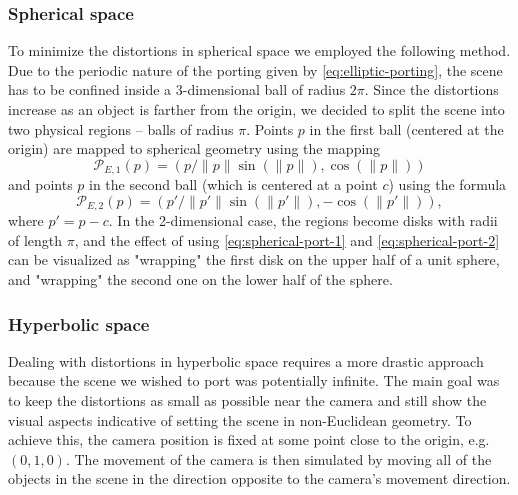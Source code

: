 \subsubsection*{Spherical space}
To minimize the distortions in spherical space we employed the following method.
Due to the periodic nature of the porting given by \autoref{eq:elliptic-porting}, the scene has to be confined inside a 3-dimensional ball of radius $2\pi$.
Since the distortions increase as an object is farther from the origin, we decided to split the scene into two physical regions -- balls of radius $\pi$.
Points $p$ in the first ball (centered at the origin) are mapped to spherical geometry using the mapping
\begin{equation} \label{eq:spherical-port-1}
    \mathcal{P}_{E,1}(p) = (p / \lVert p\rVert \sin(\lVert p\rVert), \cos(\lVert p\rVert))
\end{equation}
and points $p$ in the second ball (which is centered at a point $c$) using the formula
\begin{equation}\label{eq:spherical-port-2}
    \mathcal{P}_{E,2}(p) = (p' / \lVert p' \rVert \sin(\lVert p' \rVert), -\cos(\lVert p'\rVert)),
\end{equation}
where $p' = p - c$.
In the 2-dimensional case, the regions become disks with radii of length $\pi$, and the effect of using \autoref{eq:spherical-port-1} and \autoref{eq:spherical-port-2} can be visualized as "wrapping" the first disk on the upper half of a unit sphere, and "wrapping" the second one on the lower half of the sphere.


\subsubsection*{Hyperbolic space}
Dealing with distortions in hyperbolic space requires a more drastic approach because the scene we wished to port was potentially infinite.
The main goal was to keep the distortions as small as possible near the camera and still show the visual aspects indicative of setting the scene in non-Euclidean geometry.
To achieve this, the camera position is fixed at some point close to the origin, e.g. $(0, 1, 0)$.
The movement of the camera is then simulated by moving all of the objects in the scene in the direction opposite to the camera's movement direction.